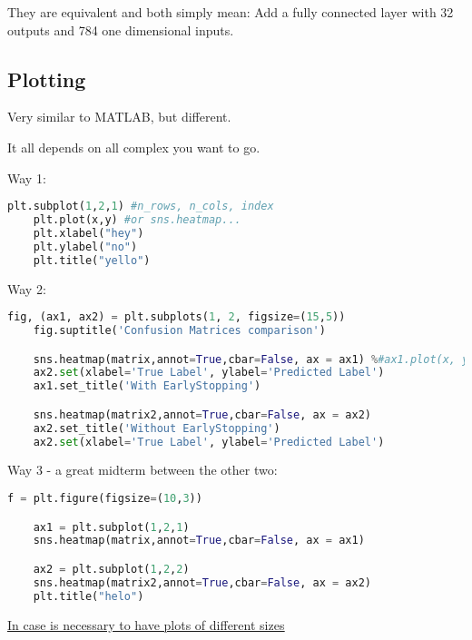 They are equivalent and both simply mean: Add a fully connected layer with 32 outputs and 784 one dimensional inputs.



\subsection{Plotting}

Very similar to MATLAB, but different.


It all depends on all complex you want to go.

Way 1:
\begin{lstlisting}[language=python]
    plt.subplot(1,2,1) #n_rows, n_cols, index
    plt.plot(x,y) #or sns.heatmap...
    plt.xlabel("hey")
    plt.ylabel("no")
    plt.title("yello")
\end{lstlisting}


Way 2:
\begin{lstlisting}[language=python]
    fig, (ax1, ax2) = plt.subplots(1, 2, figsize=(15,5))
    fig.suptitle('Confusion Matrices comparison')

    sns.heatmap(matrix,annot=True,cbar=False, ax = ax1) %#ax1.plot(x, y)
    ax2.set(xlabel='True Label', ylabel='Predicted Label')
    ax1.set_title('With EarlyStopping')

    sns.heatmap(matrix2,annot=True,cbar=False, ax = ax2)
    ax2.set_title('Without EarlyStopping')
    ax2.set(xlabel='True Label', ylabel='Predicted Label')
\end{lstlisting}


Way 3 - a great midterm between the other two:
\begin{lstlisting}[language=python]
    f = plt.figure(figsize=(10,3))

    ax1 = plt.subplot(1,2,1)
    sns.heatmap(matrix,annot=True,cbar=False, ax = ax1)

    ax2 = plt.subplot(1,2,2)
    sns.heatmap(matrix2,annot=True,cbar=False, ax = ax2)
    plt.title("helo")    
\end{lstlisting}




\href{https://stackoverflow.com/questions/10388462/matplotlib-different-size-subplots}{\ul{In case is necessary to have plots of different sizes}}












